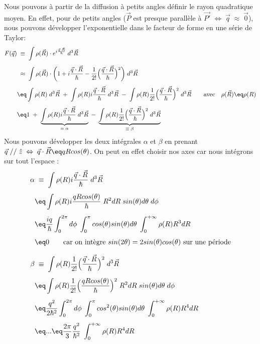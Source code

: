 Nous pouvons à partir de la diffusion à petits angles définir le rayon quadratique moyen. En effet, pour de petits angles ($\vec{P}$ est presque parallèle à $\vec{P'} \; \Leftrightarrow \; \vec{q}\;\approx\;\vec{0}$), nous pouvons développer l'exponentielle dans le facteur de forme en une série de Taylor:
\begin{align*}
    F(\vec{q}) &\;\equiv\;
    \int \rho(\vec{R}) \cdot e^{i\frac{\vec{q} \cdot \vec{R}}{\hbar}} \; d^3\vec{R}\\[4pt]
    &\;\approx\;
    \int \rho(\vec{R}) \cdot \bigg( 
    1 + i\dfrac{\vec{q}\cdot\vec{R}}{\hbar} - \dfrac{1}{2!} \Big( \dfrac{\vec{q}\cdot\vec{R}}{\hbar}\Big)^2
    \bigg) \; d^3\vec{R}\\[4pt]
    &\eq
    \int \rho(R) \;d^3\vec{R}
    \;+\;
    \int \rho(R)  i\dfrac{\vec{q}\cdot\vec{R}}{\hbar} \; d^3\vec{R}
    \;-\;
    \int \rho(R)  \dfrac{1}{2!} \Big( \dfrac{\vec{q}\cdot\vec{R}}{\hbar}\Big)^2  \; d^3\vec{R}
    \qquad \text{avec} \quad \rho(\vec{R}) \eq \rho(R)\\[4pt]
    &\eq
    1
    \;+\;
    \underbrace{\int \rho(R)  i\dfrac{\vec{q}\cdot\vec{R}}{\hbar} \; d^3\vec{R}}_{\equiv \; \alpha} 
    \;-\;
    \underbrace{ \int \rho(R)  \dfrac{1}{2!} \Big( \dfrac{\vec{q}\cdot\vec{R}}{\hbar}\Big)^2  \; d^3\vec{R}}_{\equiv \; \beta}
\end{align*}
Nous pouvons développer les deux intégrales $\alpha$ et $\beta$ en prenant $\vec{q}\; \slash{}\slash{}\; \hat{z} \;\Leftrightarrow\; \vec{q}\cdot\vec{R} \eq qRcos(\theta)$. On peut en effet choisir nos axes car nous intégrons sur tout l'espace :
\begin{align*}
    \alpha &\;\equiv\;
    \int \rho(R)  i\dfrac{\vec{q}\cdot\vec{R}}{\hbar} \; d^3\vec{R}\\[4pt]
    &\eq
    \int \rho(R)  i\dfrac{qRcos(\theta)}{\hbar} \; R^2dR \;sin(\theta)d\theta \; d\phi\\[4pt]
    &\eq
    \dfrac{iq}{\hbar} \int_0^{2\pi} d\phi \; \int_0^{\pi} cos(\theta) sin(\theta) d\theta \;\int_0^{+\infty}\rho(R) R^3 dR \\[4pt]
    &\eq 0 \qquad \text{car on intègre $sin(2\theta)=2sin(\theta)cos(\theta)$ sur une période}
    \\[7pt]
    \beta &\;\equiv\;
    \int \rho(R)  \dfrac{1}{2!} \Big( \dfrac{\vec{q}\cdot\vec{R}}{\hbar}\Big)^2  \; d^3\vec{R}\\[4pt]
    &\eq
    \int \rho(R)  \dfrac{1}{2!} \Big( \dfrac{qRcos(\theta)}{\hbar}\Big)^2  \; R^2dR \;sin(\theta)d\theta \; d\phi\\[4pt]
    &\eq
    \dfrac{q^2}{2\hbar^2}
    \int_0^{2\pi} d\phi \; \int_0^{\pi} cos^2(\theta) sin(\theta) d\theta \;\int_0^{+\infty}\rho(R) R^4 dR \\[4pt]
    &\eq ... \eq \dfrac{2\pi}{3}\dfrac{q^2}{\hbar^2} \;\int_0^{+\infty}\rho(R) R^4 dR
\end{align*}
